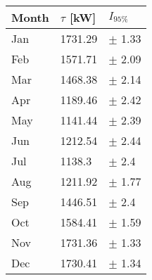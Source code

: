 \begin{tabular}{lll}
\toprule
Month & $\tau$ [kW] &   $I_{95\%}$ \\
\midrule
  Jan &     1731.29 &   $\pm$ 1.33 \\
  Feb &     1571.71 &   $\pm$ 2.09 \\
  Mar &     1468.38 &   $\pm$ 2.14 \\
  Apr &     1189.46 &   $\pm$ 2.42 \\
  May &     1141.44 &   $\pm$ 2.39 \\
  Jun &     1212.54 &   $\pm$ 2.44 \\
  Jul &      1138.3 &    $\pm$ 2.4 \\
  Aug &     1211.92 &   $\pm$ 1.77 \\
  Sep &     1446.51 &    $\pm$ 2.4 \\
  Oct &     1584.41 &   $\pm$ 1.59 \\
  Nov &     1731.36 &   $\pm$ 1.33 \\
  Dec &     1730.41 &   $\pm$ 1.34 \\
\bottomrule
\end{tabular}
